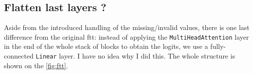 \subsection{Flatten last layers ?}


Aside from the introduced handling of the missing/invalid values, there is one last difference from the original
\gls{ftt}: instead of applying the \verb|MultiHeadAttention| layer in the end of the whole stack of blocks to obtain
the logits, we use a fully-connected \verb|Linear| layer. I have no idea why I did this. The whole structure is shown
on the \autoref{fig:ftt}.

